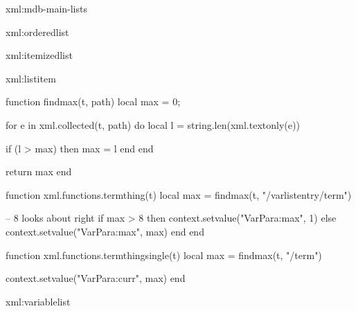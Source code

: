 
\startxmlsetups xml:mdb-main-lists

\stopxmlsetups


\startxmlsetups xml:orderedlist
	\startitemize[n]
	\stopitemize
\stopxmlsetups

\startxmlsetups xml:itemizedlist
	\startitemize[1]
	\stopitemize
\stopxmlsetups

\startxmlsetups xml:listitem
	\item
\stopxmlsetups

\startluacode

function findmax(t, path)
	local max = 0;

	for e in xml.collected(t, path) do
		local l = string.len(xml.textonly(e))

		if (l > max) then
			max = l
		end
	end

	return max
end

function xml.functions.termthing(t)
	local max = findmax(t, "/varlistentry/term")

	-- 8 looks about right
	if max > 8 then
		context.setvalue("VarPara:max", 1)
	else
		context.setvalue("VarPara:max", max)
	end
end

function xml.functions.termthingsingle(t)
	local max = findmax(t, "/term")

	context.setvalue("VarPara:curr", max)
end

\stopluacode

\startxmlsetups xml:variablelist


	\setupparagraphs[VarPara][1][width=\getvalue{VarPara:max}ex]
	\setupparagraphs[VarPara][2][width=]


